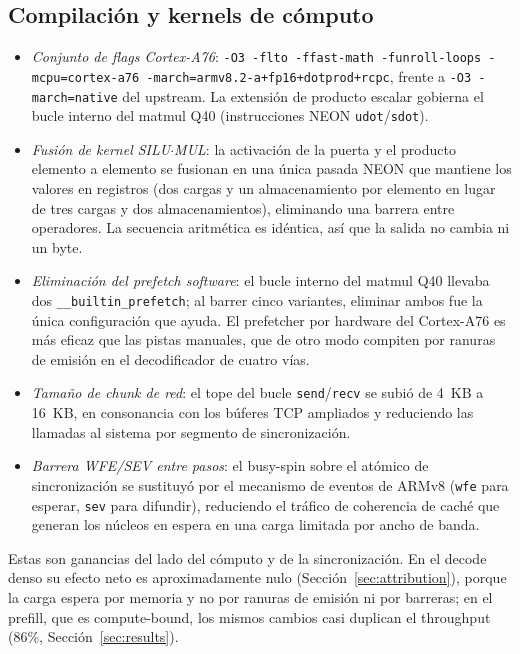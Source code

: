 \documentclass[10pt,a4paper]{article}
\begin{document}
\subsection{Compilación y kernels de cómputo}
\begin{itemize}
  \item \emph{Conjunto de flags Cortex-A76}: \texttt{-O3 -flto -ffast-math -funroll-loops -mcpu=cortex-a76 -march=armv8.2-a+fp16+dotprod+rcpc}, frente a \texttt{-O3 -march=native} del upstream. La extensión de producto escalar gobierna el bucle interno del matmul Q40 (instrucciones NEON \texttt{udot}/\texttt{sdot}).
  \item \emph{Fusión de kernel SILU$\cdot$MUL}: la activación de la puerta y el producto elemento a elemento se fusionan en una única pasada NEON que mantiene los valores en registros (dos cargas y un almacenamiento por elemento en lugar de tres cargas y dos almacenamientos), eliminando una barrera entre operadores. La secuencia aritmética es idéntica, así que la salida no cambia ni un byte.
  \item \emph{Eliminación del prefetch software}: el bucle interno del matmul Q40 llevaba dos \texttt{\_\_builtin\_prefetch}; al barrer cinco variantes, eliminar ambos fue la única configuración que ayuda. El prefetcher por hardware del Cortex-A76 es más eficaz que las pistas manuales, que de otro modo compiten por ranuras de emisión en el decodificador de cuatro vías.
  \item \emph{Tamaño de chunk de red}: el tope del bucle \texttt{send}/\texttt{recv} se subió de 4~KB a 16~KB, en consonancia con los búferes TCP ampliados y reduciendo las llamadas al sistema por segmento de sincronización.
  \item \emph{Barrera WFE/SEV entre pasos}: el busy-spin sobre el atómico de sincronización se sustituyó por el mecanismo de eventos de ARMv8 (\texttt{wfe} para esperar, \texttt{sev} para difundir), reduciendo el tráfico de coherencia de caché que generan los núcleos en espera en una carga limitada por ancho de banda.
\end{itemize}
Estas son ganancias del lado del cómputo y de la sincronización. En el decode denso su efecto neto es aproximadamente nulo (Sección~\ref{sec:attribution}), porque la carga espera por memoria y no por ranuras de emisión ni por barreras; en el prefill, que es compute-bound, los mismos cambios casi duplican el throughput (86\%, Sección~\ref{sec:results}).
\end{document}
